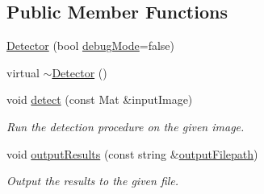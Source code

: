 \subsection*{Public Member Functions}
\begin{DoxyCompactItemize}
\item 
\hyperlink{classmultiscale_1_1analysis_1_1Detector_ae761f485926eead354aa361f1f57e167}{Detector} (bool \hyperlink{classmultiscale_1_1analysis_1_1Detector_a4b42f796957efd6ee0b8cf7645494a65}{debug\-Mode}=false)
\item 
virtual \hyperlink{classmultiscale_1_1analysis_1_1Detector_ae16b7bf62f39cb287927d56ca17663d7}{$\sim$\-Detector} ()
\item 
void \hyperlink{classmultiscale_1_1analysis_1_1Detector_acfb9aaec94382e4a7bee6d9874d4bcef}{detect} (const Mat \&input\-Image)
\begin{DoxyCompactList}\small\item\em Run the detection procedure on the given image. \end{DoxyCompactList}\item 
void \hyperlink{classmultiscale_1_1analysis_1_1Detector_a122d92e3710571c136339747bf0568e8}{output\-Results} (const string \&\hyperlink{classmultiscale_1_1analysis_1_1Detector_a1a83df16d8afd347c0e1c9ddc41c9bee}{output\-Filepath})
\begin{DoxyCompactList}\small\item\em Output the results to the given file. \end{DoxyCompactList}\end{DoxyCompactItemize}
